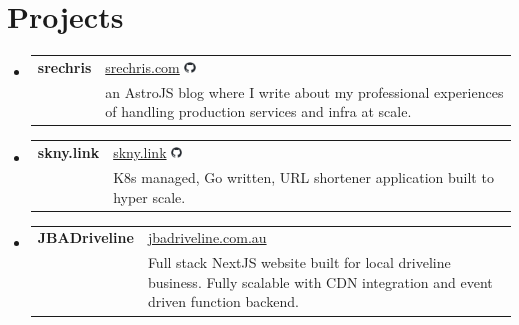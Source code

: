 \section*{Projects}
\begin{itemize}[leftmargin=0.15in, label={}]
  \item{
    \begin{tabular}{p{4.5cm} p{12cm}}
      \textbf{srechris} & \href{https://www.srechris.com}{srechris.com} \hspace{1em} \href{https://github.com/christophersherman/my_blog}{\includegraphics[height=0.8em]{github.png}} \\
      & \small an AstroJS blog where I write about my professional experiences of handling production services and infra at scale.  \\
    \end{tabular}
  }
  \item{
    \begin{tabular}{p{4.5cm} p{12cm}}
      \textbf{skny.link} & \href{https://skny.link}{skny.link} \hspace{1em} \href{https://github.com/christophersherman/skny.link}{\includegraphics[height=0.8em]{github.png}} \\
      & \small K8s managed, Go written, URL shortener application built to hyper scale. \\
    \end{tabular}
  }
  \item{
    \begin{tabular}{p{4.5cm} p{12cm}}
      \textbf{JBADriveline} & \href{https://www.jbadriveline.com.au/}{jbadriveline.com.au} \hspace{1em} \\
      & \small Full stack NextJS website built for local driveline business. Fully scalable with CDN integration and event driven function backend.  \\
    \end{tabular}
  }
\end{itemize}